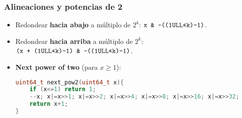 \subsubsection*{Alineaciones y potencias de 2}
\begin{itemize}
  \item Redondear \textbf{hacia abajo} a múltiplo de $2^k$:
  \(\texttt{x \& \string~((1ULL<<k)-1)}\).
  \item Redondear \textbf{hacia arriba} a múltiplo de $2^k$:
  \(\texttt{(x + (1ULL<<k)-1) \& \string~((1ULL<<k)-1)}\).
  \item \textbf{Next power of two} (para $x\ge1$):
\begin{lstlisting}[language=C++]
uint64_t next_pow2(uint64_t x){
    if (x<=1) return 1;
    --x; x|=x>>1; x|=x>>2; x|=x>>4; x|=x>>8; x|=x>>16; x|=x>>32;
    return x+1;
}
\end{lstlisting}
\end{itemize}
